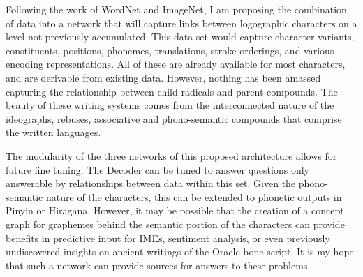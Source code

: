 Following the work of WordNet\cite{wordnet} and ImageNet\cite{imagenet}, I am proposing the combination of data into a network that will capture links between logographic characters on a level not previously accumulated. This data set would capture character variants, constituents, positions, phonemes, translations, stroke orderings, and various encoding representations. All of these are already available for most characters, and are derivable from existing data. However, nothing has been amassed capturing the relationship between child radicals and parent compounds. The beauty of these writing systems comes from the interconnected nature of the ideographs, rebuses, associative and phono-semantic compounds that comprise the written languages.

The modularity of the three networks of this proposed architecture allows for future fine tuning. The Decoder can be tuned to answer questions only answerable by relationships between data within this set. Given the phono-semantic nature of the characters, this can be extended to phonetic outputs in Pinyin or Hiragana. However, it may be possible that the creation of a concept graph for graphemes behind the semantic portion of the characters can provide benefits in predictive input for IMEs, sentiment analysis, or even previously undiscovered insights on ancient writings of the Oracle bone script. It is my hope that such a network can provide sources for answers to these problems.
